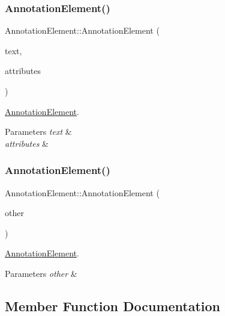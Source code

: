 \subsubsection{\texorpdfstring{Annotation\+Element()}{AnnotationElement()}\hspace{0.1cm}{\footnotesize\ttfamily [2/3]}}
{\footnotesize\ttfamily Annotation\+Element\+::\+Annotation\+Element (\begin{DoxyParamCaption}\item[{const Q\+String \&}]{text,  }\item[{const Q\+Hash$<$ Q\+String, Q\+Variant $>$ \&}]{attributes }\end{DoxyParamCaption})}



\hyperlink{class_annotation_element}{Annotation\+Element}. 


\begin{DoxyParams}{Parameters}
{\em text} & \\
\hline
{\em attributes} & \\
\hline
\end{DoxyParams}
\mbox{\label{class_annotation_element_a9add1ee0c531f6b65743e691a42991fe}} 
\subsubsection{\texorpdfstring{Annotation\+Element()}{AnnotationElement()}\hspace{0.1cm}{\footnotesize\ttfamily [3/3]}}
{\footnotesize\ttfamily Annotation\+Element\+::\+Annotation\+Element (\begin{DoxyParamCaption}\item[{const \hyperlink{class_annotation_element}{Annotation\+Element} \&}]{other }\end{DoxyParamCaption})}



\hyperlink{class_annotation_element}{Annotation\+Element}. 


\begin{DoxyParams}{Parameters}
{\em other} & \\
\hline
\end{DoxyParams}


\subsection{Member Function Documentation}
\mbox{\label{class_annotation_element_aefb0498f0c301d7c1f04ba2d32397f7c}} 
